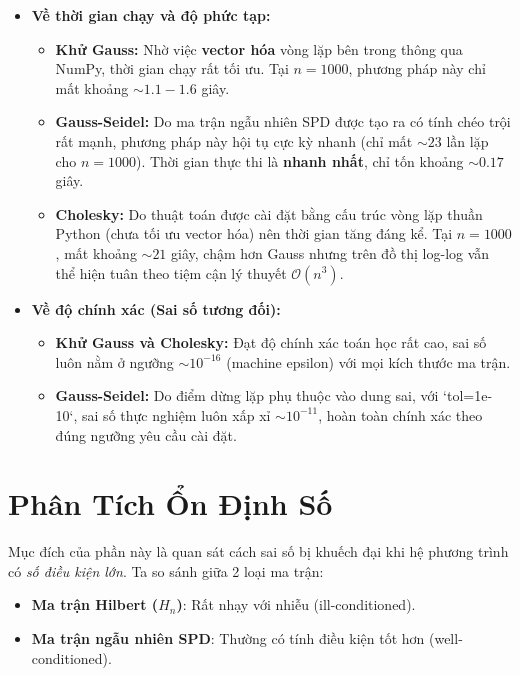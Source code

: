 \documentclass[a4paper,12pt]{report}
\begin{document}
\begin{itemize}
    \item \textbf{Về thời gian chạy và độ phức tạp:}
    \begin{itemize}
        \item \textbf{Khử Gauss:} Nhờ việc \textbf{vector hóa} vòng lặp bên trong thông qua NumPy, thời gian chạy rất tối ưu. Tại $n=1000$, phương pháp này chỉ mất khoảng $\sim 1.1 - 1.6$ giây.
        \item \textbf{Gauss-Seidel:} Do ma trận ngẫu nhiên SPD được tạo ra có tính chéo trội rất mạnh, phương pháp này hội tụ cực kỳ nhanh (chỉ mất $\sim 23$ lần lặp cho $n=1000$). Thời gian thực thi là \textbf{nhanh nhất}, chỉ tốn khoảng $\sim 0.17$ giây.
        \item \textbf{Cholesky:} Do thuật toán được cài đặt bằng cấu trúc vòng lặp thuần Python (chưa tối ưu vector hóa) nên thời gian tăng đáng kể. Tại $n=1000$, mất khoảng $\sim 21$ giây, chậm hơn Gauss nhưng trên đồ thị log-log vẫn thể hiện tuân theo tiệm cận lý thuyết $\mathcal{O}(n^3)$.
    \end{itemize}
    
    \item \textbf{Về độ chính xác (Sai số tương đối):}
    \begin{itemize}
        \item \textbf{Khử Gauss và Cholesky:} Đạt độ chính xác toán học rất cao, sai số luôn nằm ở ngưỡng $\sim 10^{-16}$ (machine epsilon) với mọi kích thước ma trận.
        \item \textbf{Gauss-Seidel:} Do điểm dừng lặp phụ thuộc vào dung sai, với `tol=1e-10`, sai số thực nghiệm luôn xấp xỉ $\sim 10^{-11}$, hoàn toàn chính xác theo đúng ngưỡng yêu cầu cài đặt.
    \end{itemize}
\end{itemize}

\newpage
\section{Phân Tích Ổn Định Số}

Mục đích của phần này là quan sát cách sai số bị khuếch đại khi hệ phương trình có \textit{số điều kiện lớn}. Ta so sánh giữa 2 loại ma trận:
\begin{itemize}
    \item \textbf{Ma trận Hilbert ($H_n$)}: Rất nhạy với nhiễu (ill-conditioned).
    \item \textbf{Ma trận ngẫu nhiên SPD}: Thường có tính điều kiện tốt hơn (well-conditioned).
\end{itemize}
\end{document}
